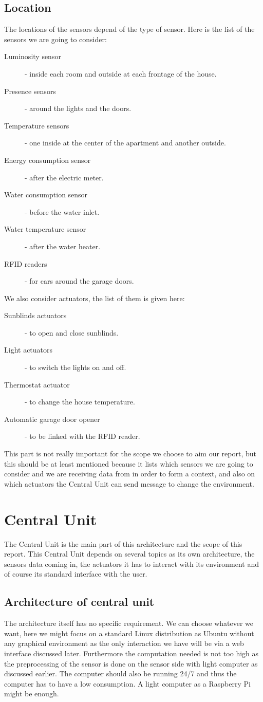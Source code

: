 \documentclass{acm_proc_article-sp}
\begin{document}
\subsection{Location}
The locations of the sensors depend of the type of sensor. Here is the list of the sensors we are going to consider:
\begin{description}
 \item[Luminosity sensor] - inside each room and outside at each frontage of the house.
 \item[Presence sensors] - around the lights and the doors.
 \item[Temperature sensors] - one inside at the center of the apartment and another outside.
 \item[Energy consumption sensor] - after the electric meter.
 \item[Water consumption sensor] - before the water inlet.
 \item[Water temperature sensor] - after the water heater.
 \item[RFID readers] - for cars around the garage doors.
\end{description}
We also consider actuators, the list of them is given here:
\begin{description}
 \item[Sunblinds actuators] - to open and close sunblinds.
 \item[Light actuators] - to switch the lights on and off.
 \item[Thermostat actuator] - to change the house temperature.
 \item[Automatic garage door opener] - to be linked with the RFID reader.
\end{description}
This part is not really important for the scope we choose to aim our report, but this should be at least mentioned because it lists which sensors we are going to consider and we are receiving data from in order to form a context, and also on which actuators the Central Unit can send message to change the environment.
\section{Central Unit}	
The Central Unit is the main part of this architecture and the scope of this report. 
This Central Unit depends on several topics as its own architecture, the sensors data coming in, 
the actuators it has to interact with its environment and of course its standard interface with the user.
\subsection{Architecture of central unit}
The architecture itself has no specific requirement. 
We can choose whatever we want, here we might focus on a standard Linux distribution as Ubuntu without any graphical environment as the only interaction we have will be via a web interface discussed later. 
Furthermore the computation needed is not too high as the preprocessing of the sensor is done on the sensor side with light computer as discussed earlier. 
The computer should also be running 24/7 and thus the computer has to have a low consumption. A light computer as a Raspberry Pi might be enough.
\end{document}
